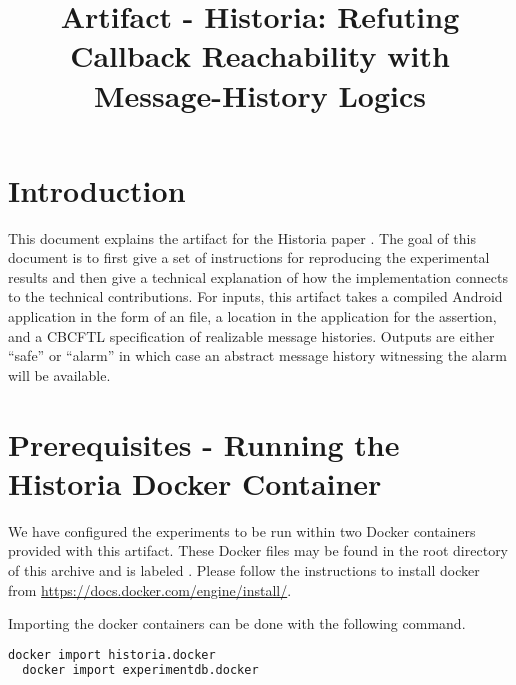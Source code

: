 \documentclass{acmart} %
\begin{document}

\newcommand{\newls}{CBCFTL\xspace}
%
\title{Artifact - Historia: Refuting Callback Reachability with Message-History Logics}

\begin{abstract}
\end{abstract}


\maketitle
%
\section{Introduction}
This document explains the artifact for the Historia paper \cite{conf/oopsla/Meier23}.
The goal of this document is to first give a set of instructions for reproducing the experimental results and then give a technical explanation of how the implementation connects to the technical contributions.
For inputs, this artifact takes a compiled Android application in the form of an  file, a location in the application for the assertion, and a \newls specification of realizable message histories.
Outputs are either ``safe'' or ``alarm'' in which case an abstract message history witnessing the alarm will be available.

\section{Prerequisites - Running the Historia Docker Container}

We have configured the experiments to be run within two Docker containers provided with this artifact.
These Docker files may be found in the root directory of this archive and is labeled .  Please follow the instructions to install docker from \url{https://docs.docker.com/engine/install/}.

Importing the docker containers can be done with the following command.

\begin{lstlisting}[language=bash]
  docker import historia.docker
  docker import experimentdb.docker
\end{lstlisting}
\end{document}
